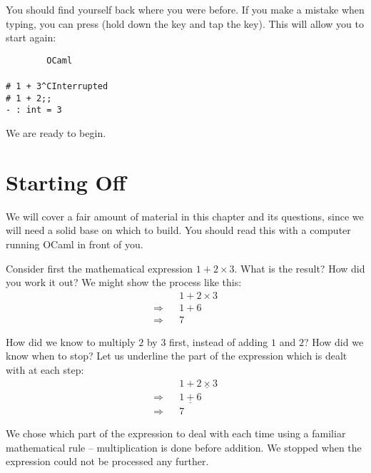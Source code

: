 \documentclass[]{book}
\newcommand{\smspace}{\vspace{4mm}}
\begin{document}
{\setlength\fboxsep{1.75pt}%

\noindent You should find yourself back where you were before. If you make a mistake when typing, you can press  (hold down the  key and tap the  key). This will allow you to start again:

}

\smspace
\noindent\verb!        OCaml!\\
\noindent\\
\noindent\verb!# 1 + 3^CInterrupted!\\
\noindent\verb!# 1 + 2;;!\\
\noindent\verb!- : int = 3!
\smspace

\noindent We are ready to begin.

\mainmatter

\pagestyle{fancy}
\chapter{Starting Off}
\label{startingoff}
We will cover a fair amount of material in this chapter and its questions, since we will need a solid base on which to build. You should read this with a computer running OCaml in front of you.

Consider first the mathematical  expression $1 + 2 \times 3$. What is the result? How did you work it out? We might show the process like this:
\begin{eqnarray*}
 & & 1 + 2 \times 3 \\
 \Longrightarrow & & 1 + 6 \\
 \Longrightarrow & & 7
\end{eqnarray*}

\noindent How did we know to multiply $2$ by $3$ first, instead of adding $1$ and $2$?
How did we know when to stop? Let us underline the part of the expression which is dealt with at each step:
\begin{eqnarray*}
 & & 1 + \underline{2 \times 3} \\
 \Longrightarrow & & \underline{1 + 6} \\
 \Longrightarrow & & 7
\end{eqnarray*}

\noindent We chose which part of the expression to deal with each time using a familiar
mathematical rule -- multiplication is done before addition. We stopped when the
expression could not be processed any further.
\end{document}
